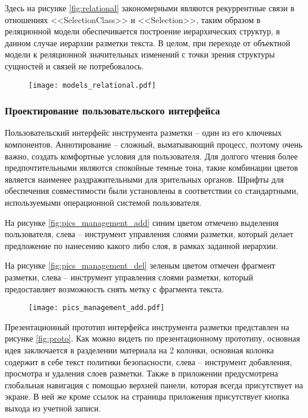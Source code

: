 \documentclass[../main]{subfiles}
\begin{document}
Здесь на рисунке \ref{fig:relational} закономерными являются рекуррентные связи в отношениях <<SelectionClass>> и <<Selection>>, таким образом в реляционной модели обеспечивается построение иерархических структур, в данном случае иерархии разметки текста. В целом, при переходе от объектной модели к реляционной значительных изменений с точки зрения структуры сущностей и связей не потребовалось.

\begin{figure}[H]
    \centering
    {\texttt{[image: models\_relational.pdf]}}
    \vspace{-\baselineskip}
\end{figure}

\subsubsection{Проектирование пользовательского интерфейса}
\label{sec:ui}

Пользовательский интерфейс инструмента разметки -- один из его ключевых компонентов. Аннотирование -- сложный, выматывающий процесс, поэтому очень важно, создать комфортные условия для пользователя. Для долгого чтения более предпочтительными являются спокойные темные тона, такие комбинации цветов является наименее раздражительными для зрительных органов. Шрифты для обеспечения совместимости были установлены в соответствии со стандартными, используемыми операционной системой пользователя.  

На рисунке \ref{fig:pics_management_add} синим цветом отмечено выделения пользователя, слева -- инструмент управления слоями разметки, который делает предложение по нанесению какого либо слоя, в рамках заданной иерархии.

На рисунке \ref{fig:pics_management_del} зеленым цветом отмечен фрагмент разметки, слева -- инструмент управления слоями разметки, который предоставляет возможность снять метку с фрагмента текста.

\begin{figure}[H]
    \centering
    {\texttt{[image: pics\_management\_add.pdf]}}
    \vspace{-\baselineskip}
\end{figure}

Презентационный прототип интерфейса инструмента разметки представлен на рисунке \ref{fig:proto}. Как можно видеть по презентационному прототипу, основная идея заключается в разделении материала на 2 колонки, основная колонка содержит в себе текст политики безопасности, слева -- инструмент добавления, просмотра и удаления слоев разметки. Также в приложении предусмотрена глобальная навигация с помощью верхней панели, которая всегда присутствует на экране. В ней же кроме ссылок на страницы приложения присутствует кнопка выхода из учетной записи.
\end{document}
